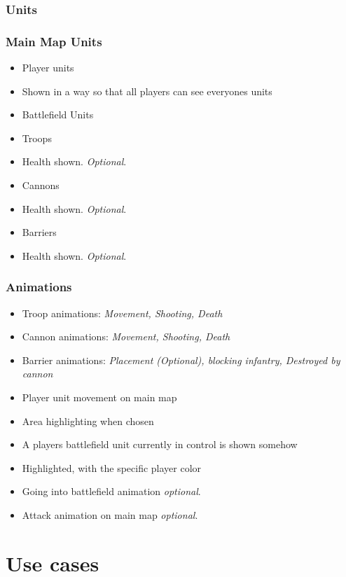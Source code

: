 \documentclass[12pt,a4paper]{article}
\let\stdsection\section
\renewcommand\section{\newpage\stdsection}
\begin{document}
\subsubsection{Units}

\subsubsection{Main Map Units}
\begin{itemize}
\item Player units
\item Shown in a way so that all players can see everyones units
\item Battlefield Units
\item Troops
\item Health shown. \emph{Optional}.
\item Cannons
\item Health shown. \emph{Optional}.
\item Barriers
\item Health shown. \emph{Optional}.
\end{itemize}

\subsubsection{Animations}

\begin{itemize}
\item Troop animations: \emph{Movement, Shooting, Death}
\item Cannon animations: \emph{Movement, Shooting, Death}
\item Barrier animations: \emph{Placement (Optional), blocking
    infantry, Destroyed by cannon}
\item Player unit movement on main map
\item Area highlighting when chosen
\item A players battlefield unit currently in control is shown somehow
\item Highlighted, with the specific player color
\item Going into battlefield animation \emph{optional}.
\item Attack animation on main map \emph{optional}.
\end{itemize}


\section{Use cases}
\end{document}
